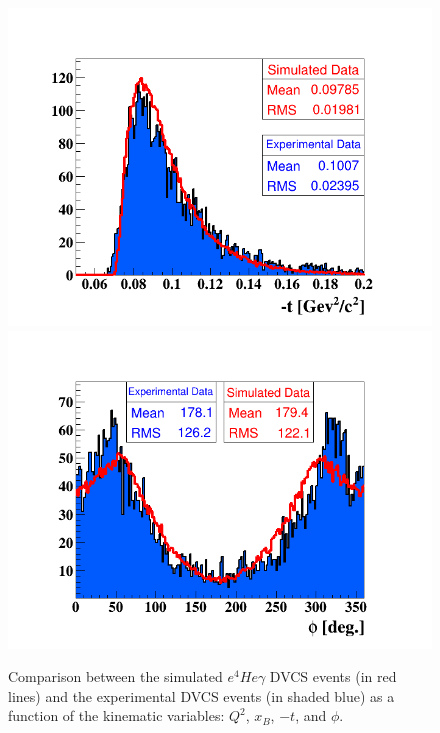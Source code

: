 \begin{figure}[h!]
\includegraphics[scale=0.31]{fig_dvcs/comp/t_Coh.png}
\hspace{+0.5in}\includegraphics[scale=0.31]{fig_dvcs/comp/phi_h_Coh.png}
\caption{Comparison between the simulated $e^{4}He\gamma$ DVCS events (in red 
lines) and the experimental DVCS events (in shaded blue) as a function of the 
kinematic variables: $Q^{2}$, $x_{B}$, $-t$, and $\phi$. }
\label{fig:coh_comparison_with_simulation_1}
\end{figure}


